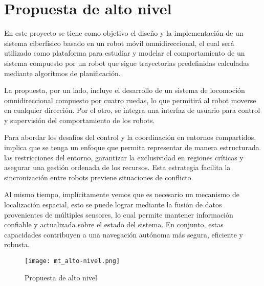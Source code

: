 \chapter{Propuesta de alto nivel}

En este proyecto se tiene como objetivo el diseño y la implementación de un sistema ciberfísico basado en un robot móvil omnidireccional, el cual será utilizado como plataforma para estudiar y modelar el comportamiento de un sistema compuesto por un robot que sigue trayectorias predefinidas calculadas mediante algoritmos de planificación.

La propuesta, por un lado, incluye el desarrollo de un sistema de locomoción omnidireccional compuesto por cuatro ruedas, lo que permitirá al robot moverse en cualquier dirección. Por el otro, se integra una interfaz de usuario para  control y supervisión del comportamiento de los robots.

Para abordar los desafíos del control y la coordinación en entornos compartidos, implica que se tenga un enfoque que permita representar de manera estructurada las restricciones del entorno, garantizar la exclusividad en regiones críticas y asegurar una gestión ordenada de los recursos. Esta estrategia facilita la sincronización entre robots previene situaciones de conflicto.

Al mismo tiempo, implícitamente vemos que es necesario un mecanismo de localización espacial, esto se puede lograr mediante la fusión de datos provenientes de múltiples sensores, lo cual permite mantener información confiable y actualizada sobre el estado del sistema. En conjunto, estas capacidades contribuyen a una navegación autónoma más segura, eficiente y robusta. \cite{papermico} \cite{negenborn2003robot}

\begin{figure}[H]
    \centering
    \texttt{[image: mt\_alto-nivel.png]}
    \caption{Propuesta de alto nivel}
    \label{fig:propaltonivel}
\end{figure}


